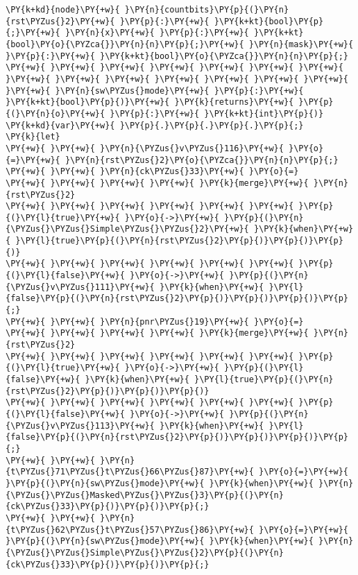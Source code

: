 \begin{Verbatim}[commandchars=\\\{\}]
\PY{k+kd}{node}\PY{+w}{ }\PY{n}{countbits}\PY{p}{(}\PY{n}{rst\PYZus{}2}\PY{+w}{ }\PY{p}{:}\PY{+w}{ }\PY{k+kt}{bool}\PY{p}{;}\PY{+w}{ }\PY{n}{x}\PY{+w}{ }\PY{p}{:}\PY{+w}{ }\PY{k+kt}{bool}\PY{o}{\PYZca{}}\PY{n}{n}\PY{p}{;}\PY{+w}{ }\PY{n}{mask}\PY{+w}{ }\PY{p}{:}\PY{+w}{ }\PY{k+kt}{bool}\PY{o}{\PYZca{}}\PY{n}{n}\PY{p}{;}
\PY{+w}{ }\PY{+w}{ }\PY{+w}{ }\PY{+w}{ }\PY{+w}{ }\PY{+w}{ }\PY{+w}{ }\PY{+w}{ }\PY{+w}{ }\PY{+w}{ }\PY{+w}{ }\PY{+w}{ }\PY{+w}{ }\PY{+w}{ }\PY{+w}{ }\PY{n}{sw\PYZus{}mode}\PY{+w}{ }\PY{p}{:}\PY{+w}{ }\PY{k+kt}{bool}\PY{p}{)}\PY{+w}{ }\PY{k}{returns}\PY{+w}{ }\PY{p}{(}\PY{n}{o}\PY{+w}{ }\PY{p}{:}\PY{+w}{ }\PY{k+kt}{int}\PY{p}{)}
\PY{k+kd}{var}\PY{+w}{ }\PY{p}{.}\PY{p}{.}\PY{p}{.}\PY{p}{;}
\PY{k}{let}
\PY{+w}{ }\PY{+w}{ }\PY{n}{\PYZus{}v\PYZus{}116}\PY{+w}{ }\PY{o}{=}\PY{+w}{ }\PY{n}{rst\PYZus{}2}\PY{o}{\PYZca{}}\PY{n}{n}\PY{p}{;}
\PY{+w}{ }\PY{+w}{ }\PY{n}{ck\PYZus{}33}\PY{+w}{ }\PY{o}{=}
\PY{+w}{ }\PY{+w}{ }\PY{+w}{ }\PY{+w}{ }\PY{k}{merge}\PY{+w}{ }\PY{n}{rst\PYZus{}2}
\PY{+w}{ }\PY{+w}{ }\PY{+w}{ }\PY{+w}{ }\PY{+w}{ }\PY{+w}{ }\PY{p}{(}\PY{l}{true}\PY{+w}{ }\PY{o}{->}\PY{+w}{ }\PY{p}{(}\PY{n}{\PYZus{}\PYZus{}Simple\PYZus{}\PYZus{}2}\PY{+w}{ }\PY{k}{when}\PY{+w}{ }\PY{l}{true}\PY{p}{(}\PY{n}{rst\PYZus{}2}\PY{p}{)}\PY{p}{)}\PY{p}{)}
\PY{+w}{ }\PY{+w}{ }\PY{+w}{ }\PY{+w}{ }\PY{+w}{ }\PY{+w}{ }\PY{p}{(}\PY{l}{false}\PY{+w}{ }\PY{o}{->}\PY{+w}{ }\PY{p}{(}\PY{n}{\PYZus{}v\PYZus{}111}\PY{+w}{ }\PY{k}{when}\PY{+w}{ }\PY{l}{false}\PY{p}{(}\PY{n}{rst\PYZus{}2}\PY{p}{)}\PY{p}{)}\PY{p}{)}\PY{p}{;}
\PY{+w}{ }\PY{+w}{ }\PY{n}{pnr\PYZus{}19}\PY{+w}{ }\PY{o}{=}
\PY{+w}{ }\PY{+w}{ }\PY{+w}{ }\PY{+w}{ }\PY{k}{merge}\PY{+w}{ }\PY{n}{rst\PYZus{}2}
\PY{+w}{ }\PY{+w}{ }\PY{+w}{ }\PY{+w}{ }\PY{+w}{ }\PY{+w}{ }\PY{p}{(}\PY{l}{true}\PY{+w}{ }\PY{o}{->}\PY{+w}{ }\PY{p}{(}\PY{l}{false}\PY{+w}{ }\PY{k}{when}\PY{+w}{ }\PY{l}{true}\PY{p}{(}\PY{n}{rst\PYZus{}2}\PY{p}{)}\PY{p}{)}\PY{p}{)}
\PY{+w}{ }\PY{+w}{ }\PY{+w}{ }\PY{+w}{ }\PY{+w}{ }\PY{+w}{ }\PY{p}{(}\PY{l}{false}\PY{+w}{ }\PY{o}{->}\PY{+w}{ }\PY{p}{(}\PY{n}{\PYZus{}v\PYZus{}113}\PY{+w}{ }\PY{k}{when}\PY{+w}{ }\PY{l}{false}\PY{p}{(}\PY{n}{rst\PYZus{}2}\PY{p}{)}\PY{p}{)}\PY{p}{)}\PY{p}{;}
\PY{+w}{ }\PY{+w}{ }\PY{n}{t\PYZus{}71\PYZus{}t\PYZus{}66\PYZus{}87}\PY{+w}{ }\PY{o}{=}\PY{+w}{ }\PY{p}{(}\PY{n}{sw\PYZus{}mode}\PY{+w}{ }\PY{k}{when}\PY{+w}{ }\PY{n}{\PYZus{}\PYZus{}Masked\PYZus{}\PYZus{}3}\PY{p}{(}\PY{n}{ck\PYZus{}33}\PY{p}{)}\PY{p}{)}\PY{p}{;}
\PY{+w}{ }\PY{+w}{ }\PY{n}{t\PYZus{}62\PYZus{}t\PYZus{}57\PYZus{}86}\PY{+w}{ }\PY{o}{=}\PY{+w}{ }\PY{p}{(}\PY{n}{sw\PYZus{}mode}\PY{+w}{ }\PY{k}{when}\PY{+w}{ }\PY{n}{\PYZus{}\PYZus{}Simple\PYZus{}\PYZus{}2}\PY{p}{(}\PY{n}{ck\PYZus{}33}\PY{p}{)}\PY{p}{)}\PY{p}{;}

\end{Verbatim}
